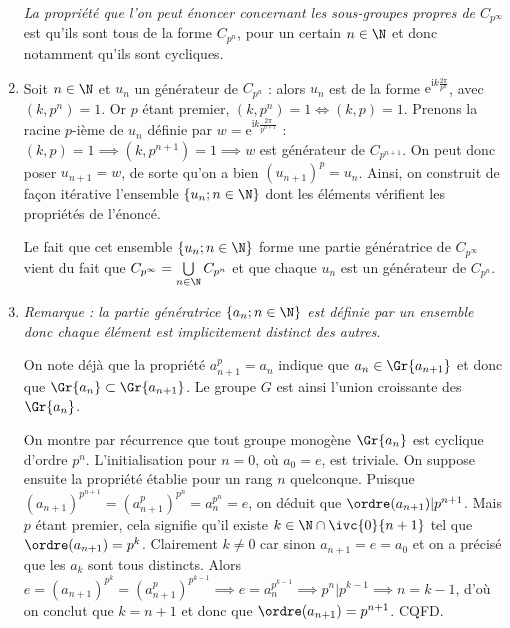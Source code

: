 \begin{enumerate}
    \emph{La propriété que l'on peut énoncer concernant les sous-groupes propres de $C_{p^{\infty}}$} est qu'ils sont tous de la forme $C_{p^{n}}$, pour un certain $n\in \N$ et donc notamment qu'ils 
    sont cycliques.

    \item Soit $n \in \N$ et $u_n$ un générateur de $C_{p^n}$ : alors $u_n$ est de la forme $\textrm{e}^{\mathrm{i}k\frac{2\pi}{p^n}}$, avec $(k,p^n) =1$. Or $p$ étant premier, 
    $(k,p^n) =1 \iff (k, p) = 1$. Prenons la racine $p$-ième de $u_n$ définie par $w = \textrm{e}^{\mathrm{i}k\frac{2\pi}{p^{n+1}}}$ : $(k,p) = 1\implies (k,p^{n+1})= 1 \implies w$ est générateur 
    de $C_{p^{n+1}}$. On peut donc poser $u_{n+1} = w$, de sorte qu'on a bien $\left(u_{n+1}\right)^p = u_n$. Ainsi, on construit de façon itérative l'ensemble $\{u_n ; n\in  \N\}$ dont les éléments vérifient les propriétés de l'énoncé.

    Le fait que cet ensemble $\{u_n; n\in  \N\}$ forme une partie génératrice de $C_{p^{\infty}}$ vient du fait que $C_{p^{\infty}} = \bigcup\limits_{n\in \N} C_{p^n}$ et que chaque $u_n$ est un générateur de $C_{p^n}$.
    \item \emph{Remarque : la partie génératrice $\{a_n;n\in \N\}$ est définie par un ensemble donc chaque élément est implicitement distinct des autres}.
    
    On note déjà que la propriété $a_{n+1}^p = a_n$ indique que $a_n \in \Gr{a_{n+1}}$ et donc que $\Gr{a_n}\subset \Gr{a_{n+1}}$. Le groupe $G$ est ainsi l'union croissante des $\Gr{a_n}$.
    
    On montre par récurrence que tout groupe monogène $\Gr{a_n}$ est cyclique d'ordre $p^n$. L'initialisation pour $n=0$, où $a_0=e$, est triviale. On suppose ensuite la propriété établie 
    pour un rang $n$ quelconque. Puisque $\left(a_{n+1}\right)^{p^{n+1}} = \left(a_{n+1}^p\right)^{p^n} = a_n^{p^n} = e$, on déduit que $\ordre(a_{n+1}) | p^{n+1}$. Mais $p$ étant premier, 
    cela signifie qu'il existe $k\in \N\cap\ivc{0}{n+1}$ tel que $ \ordre(a_{n+1}) = p^k$. Clairement $k\neq 0$ car sinon $a_{n+1}=e = a_0$ et on a précisé que les $a_k$ sont tous distincts. 
    Alors $e = \left(a_{n+1}\right)^{p^k} = \left(a_{n+1}^p \right)^{p^{k-1}}\implies e = a_n^{p^{k-1}} \implies p^n | p^{k-1} \implies n = k-1$, d'où on conclut que $k=n+1$ et donc que $ \ordre(a_{n+1}) = p^{n+1}$. CQFD.\medskip


\end{enumerate}
